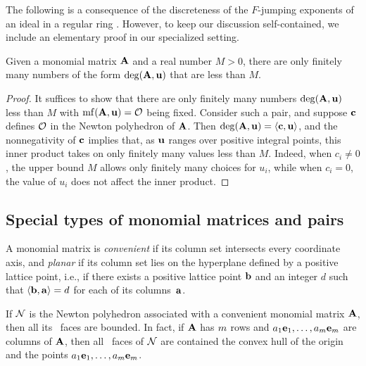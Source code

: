 \documentclass{article}
\begin{document}
The following is a consequence of the discreteness of the $F$-jumping exponents of an ideal in a regular ring \cite[Theorem~3.1]{blickle+mustata+smith.discr_rat_FPTs}.
However, to keep our discussion self-contained, we include an elementary proof in our specialized setting.

\begin{proposition}
   \label{discreteness: P}
   Given a monomial matrix $\mathbf{A}$ and a real number $M > 0 $, there are only finitely many numbers of the form $\operatorname{deg}(\mathbf{A},\mathbf{u})$ that are less than $M$.
\end{proposition}

\begin{proof}
   It suffices to show that there are only finitely many numbers $\operatorname{deg}(\mathbf{A},\mathbf{u})$ less than $M$ with $\operatorname{mf}(\mathbf{A}, \mathbf{u}) = \mathcal{O}$ being fixed.
   Consider such a pair, and suppose $\mathbf{c}$ defines $\mathcal{O}$ in the Newton polyhedron of $\mathbf{A}$.
   Then $\operatorname{deg}(\mathbf{A},\mathbf{u}) = \langle \mathbf{c}, \mathbf{u} \rangle$, and the nonnegativity of $\mathbf{c}$ implies that, as $\mathbf{u}$ ranges over positive integral points, this inner product takes on only finitely many values less than $M$.
   Indeed, when $c_i \ne 0$, the upper bound $M$ allows only finitely many choices for $u_i$, while when $c_i = 0$, the value of $u_i$ does not affect the inner product.
\end{proof}

\subsection{Special types of monomial matrices and pairs}
\label{ss: special matrices and pairs}

\begin{definition}
   A monomial matrix is \emph{convenient} if its column set intersects every coordinate axis, and \emph{planar} if its column set lies on the hyperplane defined by a positive lattice point, i.e., if there exists a positive lattice point $\mathbf{b}$ and an integer $d$ such that $\langle \mathbf{b}, \mathbf{a} \rangle = d$ for each of its columns~$\mathbf{a}$.
\end{definition}

\begin{remark}
   If $\mathcal{N}$ is the Newton polyhedron associated with a convenient monomial matrix $\mathbf{A}$, then all its \positive\ faces are bounded.
   In fact, if $\mathbf{A}$ has $m$ rows and $a_1\mathbf{e}_1, \ldots, a_m \mathbf{e}_{m}$ are columns of $\mathbf{A}$, then all \positive\ faces of $\mathcal{N}$ are contained the convex hull of the origin and the points $a_1\mathbf{e}_1, \ldots, a_m \mathbf{e}_{m}$.
\end{remark}
\end{document}
